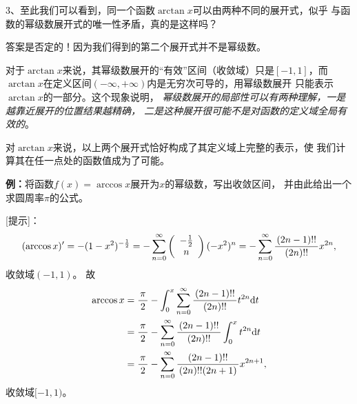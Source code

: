 \begin{shaded}
	\begin{center}
	\end{center}

	3、至此我们可以看到，同一个函数$\arctan x$可以由两种不同的展开式，似乎
	与函数的幂级数展开式的唯一性矛盾，真的是这样吗？

	答案是否定的！因为我们得到的第二个展开式并不是幂级数。

	对于$\arctan x$来说，其幂级数展开的“有效”区间（收敛域）只是$[-1,1]$，而
	$\arctan x$在定义区间$(-\infty,+\infty)$内是无穷次可导的，用幂级数展开
	只能表示$\arctan x$的一部分。这个现象说明，
	{\it 幂级数展开的局部性可以有两种理解，一是越靠近展开的位置结果越精确，
	二是这种展开很可能不是对函数的定义域全局有效的}。

	对$\arctan x$来说，以上两个展开式恰好构成了其定义域上完整的表示，使
	我们计算其在任一点处的函数值成为了可能。
\end{shaded}

{\bf 例：}将函数$f(x)=\arccos x$展开为$x$的幂级数，写出收敛区间，
并由此给出一个求圆周率$\pi$的公式。

[提示]：
$$(\arccos x)'=-(1-x^2)^{-\frac12}
=-\sum\limits_{n=0}^{\infty}
\left(\begin{array}{c} -\frac12 \\ n \end{array}\right)(-x^2)^n
=-\sum\limits_{n=0}^{\infty}\displaystyle\frac{\,{(2n-1)!!}\,}{\,{(2n)!!}\,}x^{2n},
$$
收敛域$(-1,1)$。
故
\begin{align*}
	\arccos x
	&=\displaystyle\frac{\,{\pi}\,}{\,{2}\,}
	-\displaystyle\int_0^x\sum\limits_{n=0}^{\infty}\displaystyle\frac{\,{(2n-1)!!}\,}{\,{(2n)!!}\,}t^{2n}\mathrm{d} t\\
	&=\displaystyle\frac{\,{\pi}\,}{\,{2}\,}-\sum\limits_{n=0}^{\infty}\displaystyle\frac{\,{(2n-1)!!}\,}{\,{(2n)!!}\,}\displaystyle\int_0^xt^{2n}\mathrm{d}
	t\\ 
	&=\displaystyle\frac{\,{\pi}\,}{\,{2}\,}-\sum\limits_{n=0}^{\infty}\displaystyle\frac{\,{(2n-1)!!}\,}{\,{(2n)!!(2n+1)}\,}x^{2n+1},
\end{align*}
收敛域$[-1,1)$。

